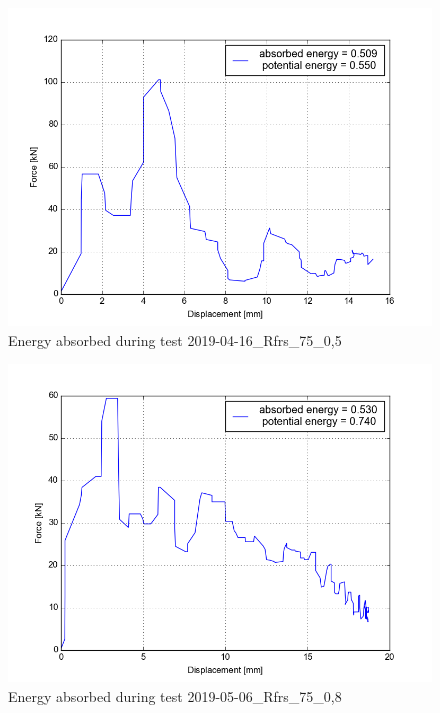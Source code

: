 \begin{figure}
    \centering
    \includegraphics[width=0.95 \linewidth]{pics/2019-04-16_Rfrs_75_0,5_energy.png}
    \caption{Energy absorbed during test 2019-04-16\_Rfrs\_75\_0,5}
    \label{fig:energy4}
\end{figure}

\begin{figure}
    \centering
    \includegraphics[width=0.95 \linewidth]{pics/2019-05-06_Rfrs_75_0,8_energy.png}
    \caption{Energy absorbed during test 2019-05-06\_Rfrs\_75\_0,8}
    \label{fig:energy5}
\end{figure}


